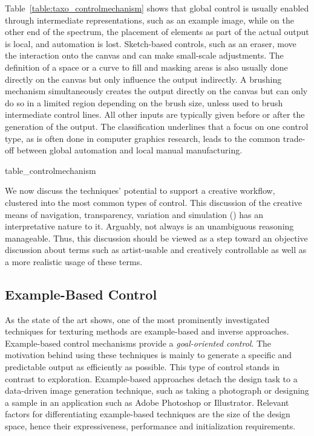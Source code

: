 Table~\ref{table:taxo_controlmechanism} shows that global control is usually enabled through intermediate representations, such as an example image, while on the other end of the spectrum, the placement of elements as part of the actual output is local, and automation is lost.  Sketch-based controls, such as an eraser, move the interaction onto the canvas and can make small-scale adjustments. The definition of a space or a curve to fill and masking areas is also usually done directly on the canvas but only influence the output indirectly. A brushing mechanism simultaneously creates the output directly on the canvas but can only do so in a limited region depending on the brush size, unless used to brush intermediate control lines. All other inputs are typically given before or after the generation of the output. The classification underlines that a focus on one control type, as is often done in computer graphics research, leads to the common trade-off between global automation and local manual manufacturing.

{table_controlmechanism}

We now discuss the techniques' potential to support a creative workflow, clustered into the most common types of control. This discussion of the creative means of navigation, transparency, variation and simulation () has an interpretative nature to it. Arguably, not always is an unambiguous reasoning manageable. Thus, this discussion should be viewed as a step toward an objective discussion about terms such as artist-usable and creatively controllable as well as a more realistic usage of these terms.

\subsection{Example-Based Control}
\label{subsubsec:analysis_creative_means_example}

As the state of the art shows, one of the most prominently investigated techniques for texturing methods are example-based and inverse approaches. Example-based control mechanisms provide a \textit{goal-oriented control}. The motivation behind using these techniques is mainly to generate a specific and predictable output as efficiently as possible. This type of control stands in contrast to exploration. Example-based approaches detach the design task to a data-driven image generation technique, such as taking a photograph or designing a sample in an application such as Adobe Photoshop or Illustrator. Relevant factors for differentiating example-based techniques are the size of the design space, hence their expressiveness, performance and initialization requirements. 

